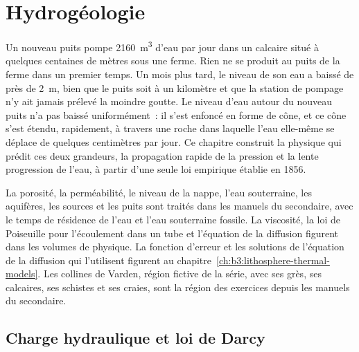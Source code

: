 \chapter{Hydrogéologie}\label{ch:b3:hydrogeology}

Un nouveau puits pompe \qty{2160}{m^3} d'eau par jour dans un calcaire situé à quelques
centaines de mètres sous une ferme. Rien ne se produit au puits de la ferme
dans un premier temps. Un mois plus tard, le niveau de son eau a baissé de près de \qty{2}{m}, bien que le
puits soit à un kilomètre et que la station de pompage n'y ait jamais prélevé la moindre goutte. Le
niveau d'eau autour du nouveau puits n'a pas baissé uniformément~: il s'est enfoncé
en forme de cône, et ce cône s'est étendu, rapidement, à travers une roche dans laquelle l'eau
elle-même se déplace de quelques centimètres par jour. Ce chapitre construit la physique qui
prédit ces deux grandeurs, la propagation rapide de la pression et la lente progression
de l'eau, à partir d'une seule loi empirique établie en 1856.

\begin{recall}
La porosité, la perméabilité, le niveau de la nappe, l'eau souterraine, les aquifères, les sources
et les puits sont traités dans les manuels du secondaire, avec le temps de résidence de l'eau et
l'eau souterraine fossile. La viscosité, la loi de Poiseuille pour l'écoulement dans un tube
et l'équation de la diffusion figurent dans les volumes de physique. La fonction d'erreur
et les solutions de l'équation de la diffusion qui l'utilisent figurent
au chapitre~\ref{ch:b3:lithosphere-thermal-models}. Les collines de Varden, région fictive de la série,
avec ses grès, ses calcaires, ses schistes et ses craies, sont la région des exercices
depuis les manuels du secondaire.
\end{recall}

\section{Charge hydraulique et loi de Darcy}\label{sec:b3:hydrogeology:darcy}

